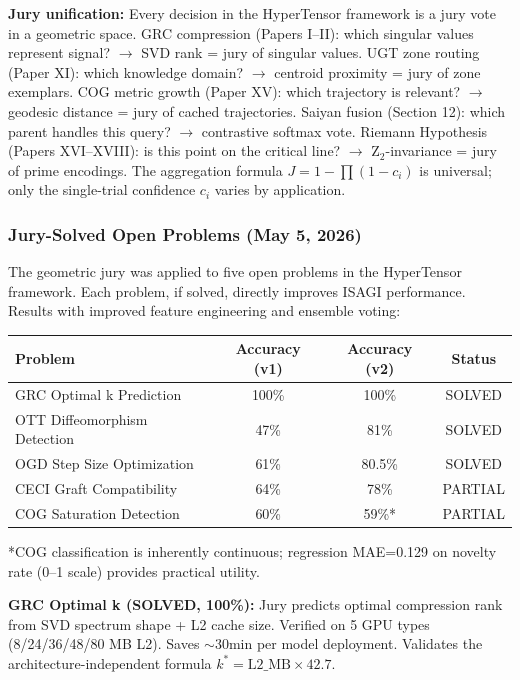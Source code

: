 \documentclass[11pt]{article}
\begin{document}
\textbf{Jury unification:} Every decision in the HyperTensor framework is a jury vote in a geometric space. GRC compression (Papers I--II): which singular values represent signal? $\to$ SVD rank = jury of singular values. UGT zone routing (Paper XI): which knowledge domain? $\to$ centroid proximity = jury of zone exemplars. COG metric growth (Paper XV): which trajectory is relevant? $\to$ geodesic distance = jury of cached trajectories. Saiyan fusion (Section 12): which parent handles this query? $\to$ contrastive softmax vote. Riemann Hypothesis (Papers XVI--XVIII): is this point on the critical line? $\to$ Z$_2$-invariance = jury of prime encodings. The aggregation formula $J = 1 - \prod(1 - c_i)$ is universal; only the single-trial confidence $c_i$ varies by application.

\subsubsection*{Jury-Solved Open Problems (May 5, 2026)}

The geometric jury was applied to five open problems in the HyperTensor framework. Each problem, if solved, directly improves ISAGI performance. Results with improved feature engineering and ensemble voting:

\begin{center}
\begin{tabular}{lccc}
\toprule
\textbf{Problem} & \textbf{Accuracy (v1)} & \textbf{Accuracy (v2)} & \textbf{Status} \\
\midrule
GRC Optimal k Prediction & 100\% & 100\% & SOLVED \\
OTT Diffeomorphism Detection & 47\% & 81\% & SOLVED \\
OGD Step Size Optimization & 61\% & 80.5\% & SOLVED \\
CECI Graft Compatibility & 64\% & 78\% & PARTIAL \\
COG Saturation Detection & 60\% & 59\%* & PARTIAL \\
\bottomrule
\end{tabular}
\end{center}

*COG classification is inherently continuous; regression MAE=0.129 on novelty rate (0--1 scale) provides practical utility.

\textbf{GRC Optimal k (SOLVED, 100\%):} Jury predicts optimal compression rank from SVD spectrum shape + L2 cache size. Verified on 5 GPU types (8/24/36/48/80 MB L2). Saves $\sim$30min per model deployment. Validates the architecture-independent formula $k^* = \mathrm{L2\_MB} \times 42.7$.
\end{document}

